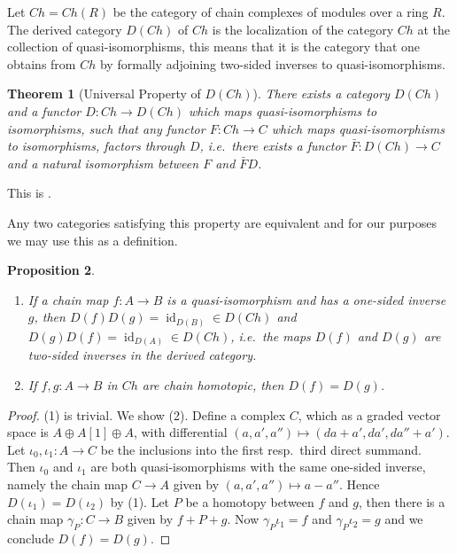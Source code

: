 \documentclass{scrartcl}
\theoremstyle{plain}
\newtheorem{theorem}{Theorem}[section]
\newtheorem{proposition}[theorem]{Proposition}
\theoremstyle{definition}
\DeclareMathOperator{\id}{id}
\begin{document}
Let $Ch=Ch(R)$ be the category of chain complexes of modules over a ring $R$. 
The derived category $D(Ch)$ of $Ch$ is the localization of the category $Ch$ at the collection of quasi-isomorphisms, this means that it is the category that one obtains from $Ch$ by formally adjoining two-sided inverses to quasi-isomorphisms.

\begin{theorem}[Universal Property of $D(Ch)$]\label{thm:derived-universal-prop}
    There exists a category $D(Ch)$ and a functor $D\colon Ch\to D(Ch)$ which maps quasi-isomorphisms to isomorphisms, such that any functor $F\colon Ch\to C$ which maps quasi-isomorphisms to isomorphisms, factors through $D$, i.e.\ there exists a functor $\bar F\colon D(Ch)\to C$ and a natural isomorphism between $F$ and $\bar F D$. 
\end{theorem}
This is \cite[Thm III.2.1]{gelfand2013methods}.

Any two categories satisfying this property are equivalent and for our purposes we may use this as a definition. 

\begin{proposition}
    \begin{enumerate}[(1)]
        \item If a chain map $f\colon A\to B$ is a quasi-isomorphism and has a one-sided inverse $g$, then $D(f)D(g) = \id_{D(B)}\in D(Ch)$ and $D(g)D(f)=\id_{D(A)}\in D(Ch)$, i.e.\ the maps $D(f)$ and $D(g)$ are two-sided inverses in the derived category.
        \item If $f, g\colon A\to B$ in $Ch$ are chain homotopic, then $D(f) = D(g)$.  
    \end{enumerate}
\end{proposition}
\begin{proof}
    (1) is trivial. We show (2). Define a complex $C$, which as a graded vector space is $A\oplus A[1]\oplus A$, with differential $(a, a', a'')\mapsto (da+a', da', da''+a')$. Let $\iota_{0}, \iota_1\colon A\to C$ be the inclusions into the first resp.\ third direct summand. Then $\iota_0$ and $\iota_1$ are both quasi-isomorphisms with the same one-sided inverse, namely the chain map $C\to A$ given by $(a, a', a'')\mapsto a-a''$. Hence $D(\iota_1) = D(\iota_2)$ by (1). Let $P$ be a homotopy between $f$ and $g$, then there is a chain map $\gamma_P\colon C\to B$ given by $f + P+ g$. Now $\gamma_P\iota_1 = f$ and $\gamma_P\iota_2=g$ and we conclude $D(f) = D(g)$.
\end{proof}
\end{document}
